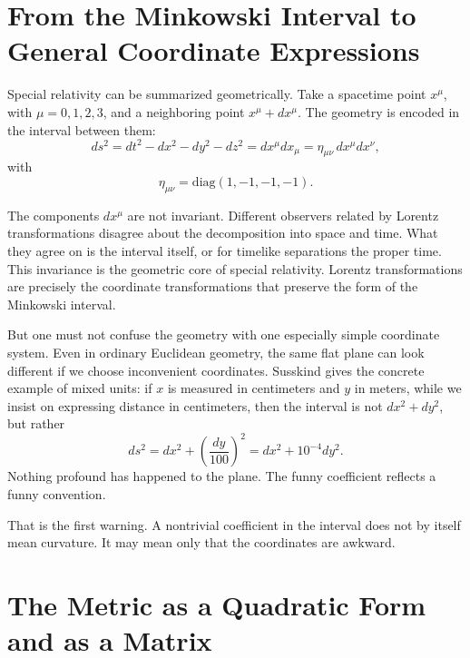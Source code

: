 \section{From the Minkowski Interval to General Coordinate Expressions}

Special relativity can be summarized geometrically. Take a spacetime point \(x^\mu\), with \(\mu=0,1,2,3\), and a neighboring point \(x^\mu+dx^\mu\). The geometry is encoded in the interval between them:
\begin{equation}
ds^2 = dt^2 - dx^2 - dy^2 - dz^2
      = dx^\mu dx_\mu
      = \eta_{\mu\nu}\,dx^\mu dx^\nu,
\end{equation}
with
\begin{equation}
\eta_{\mu\nu} = \mathrm{diag}(1,-1,-1,-1).
\end{equation}

The components \(dx^\mu\) are not invariant. Different observers related by Lorentz transformations disagree about the decomposition into space and time. What they agree on is the interval itself, or for timelike separations the proper time. This invariance is the geometric core of special relativity. Lorentz transformations are precisely the coordinate transformations that preserve the form of the Minkowski interval.

But one must not confuse the geometry with one especially simple coordinate system. Even in ordinary Euclidean geometry, the same flat plane can look different if we choose inconvenient coordinates. Susskind gives the concrete example of mixed units: if \(x\) is measured in centimeters and \(y\) in meters, while we insist on expressing distance in centimeters, then the interval is not \(dx^2+dy^2\), but rather
\begin{equation}
ds^2 = dx^2 + \left(\frac{dy}{100}\right)^2
     = dx^2 + 10^{-4}dy^2.
\end{equation}
Nothing profound has happened to the plane. The funny coefficient reflects a funny convention.

That is the first warning. A nontrivial coefficient in the interval does not by itself mean curvature. It may mean only that the coordinates are awkward.

\section{The Metric as a Quadratic Form and as a Matrix}

